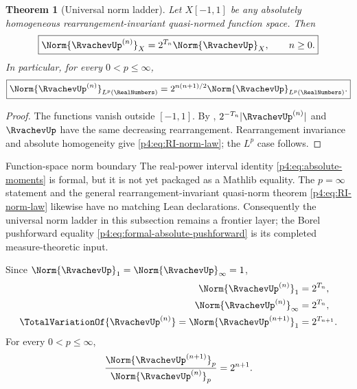 \documentclass[11pt,oneside]{article}
\newtheorem{theorem}{Theorem}[section]
\theoremstyle{definition}
\theoremstyle{remark}
\begin{document}
\begin{theorem}[Universal norm ladder]
\label{p4:thm:universal-norm-ladder}
Let $X[-1,1]$ be any absolutely homogeneous rearrangement-invariant quasi-normed function
space.  Then
\begin{equation}
 \boxed{
 \Norm{\RvachevUp^{(n)}}_X=2^{T_n}\Norm{\RvachevUp}_X,
 \qquad n\geq0.}
 \label{p4:eq:RI-norm-law}
\end{equation}
In particular, for every $0<p\leq\infty$,
\begin{equation}
 \boxed{
 \Norm{\RvachevUp^{(n)}}_{L^p(\RealNumbers)}
 =2^{n(n+1)/2}\Norm{\RvachevUp}_{L^p(\RealNumbers)}.}
 \label{p4:eq:Lp-norm-law}
\end{equation}
\end{theorem}

\begin{proof}
The functions vanish outside $[-1,1]$.  By ,
$2^{-T_n}|\RvachevUp^{(n)}|$ and $\RvachevUp$ have the same decreasing rearrangement.  Rearrangement
invariance and absolute homogeneity give \eqref{p4:eq:RI-norm-law}; the $L^p$ case follows.
\end{proof}

\begin{statusbox}{Function-space norm boundary}
The real-power interval identity \eqref{p4:eq:absolute-moments} is formal, but it is not yet
packaged as a Mathlib  equality.  The \(p=\infty\) statement and the general
rearrangement-invariant quasi-norm theorem \eqref{p4:eq:RI-norm-law} likewise have no matching
Lean declarations.  Consequently the universal norm ladder in this subsection remains a
frontier layer; the Borel pushforward equality
\eqref{p4:eq:formal-absolute-pushforward} is its completed measure-theoretic input.
\end{statusbox}

\begin{corollary}
\label{p4:cor:sup-TV}
Since $\Norm{\RvachevUp}_1=\Norm{\RvachevUp}_\infty=1$,
\begin{align}
 \Norm{\RvachevUp^{(n)}}_1&=2^{T_n},\label{p4:eq:L1-exact}\\
 \Norm{\RvachevUp^{(n)}}_\infty&=2^{T_n},\label{p4:eq:Linf-exact}\\
 \TotalVariationOf{\RvachevUp^{(n)}}
 =\Norm{\RvachevUp^{(n+1)}}_1&=2^{T_{n+1}}.
 \label{p4:eq:TV-exact}
\end{align}
For every $0<p\leq\infty$,
\begin{equation}
 \frac{\Norm{\RvachevUp^{(n+1)}}_p}{\Norm{\RvachevUp^{(n)}}_p}=2^{n+1}.
 \label{p4:eq:successive-norm-ratio}
\end{equation}
\end{corollary}
\end{document}

